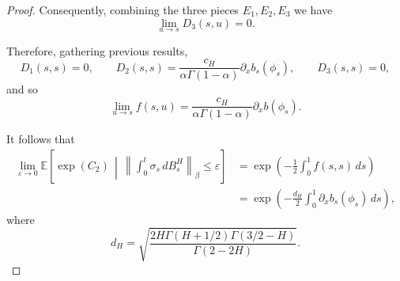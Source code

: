 \documentclass[10pt,a4paper]{amsart}
\begin{document}
\begin{proof}
Consequently, combining the three pieces \(E_1,E_2,E_3\) we have
\[
\lim_{u\to s} D_3(s,u)=0.
\]

Therefore, gathering previous results,
\[
D_1(s,s)=0,\qquad D_2(s,s)=\frac{c_H}{\alpha\Gamma(1-\alpha)}\partial_x b_s(\phi_s),
\qquad D_3(s,s)=0,
\]
and so
\[
\lim_{u\to s} f(s,u)=\frac{c_H}{\alpha\Gamma(1-\alpha)}\partial_x b(\phi_s).
\]

It follows that  
\begin{align*}
\lim_{\varepsilon \to 0} \mathbb{E} \left[ \exp(C_2) \,\middle|\, \left\| \int_0^t \sigma_s\, dB^H_s \right\|_\beta \leq \varepsilon \right] 
&= \exp\left( -\frac{1}{2} \int_0^1 f(s,s)\,ds \right) \\
&= \exp\left( -\frac{d_H}{2} \int_0^1 \partial_x b_s(\phi_s)\,ds \right),
\end{align*}
where
\begin{equation*}
    d_H= \sqrt{\frac{2H\Gamma(H+1/2)\Gamma(3/2-H)}{\Gamma(2-2H)}}.
\end{equation*}











\end{proof}
\end{document}

